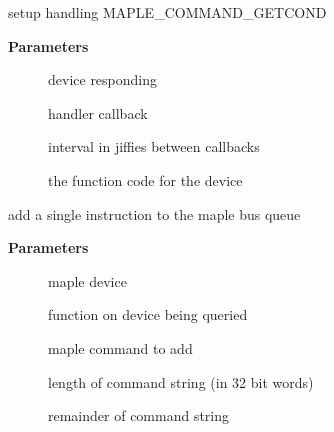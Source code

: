 \documentclass[a4paper,8pt,english]{sphinxmanual}
\begin{document}
\begin{fulllineitems}
\label{sh/index:c.maple_getcond_callback}
setup handling MAPLE\_COMMAND\_GETCOND

\end{fulllineitems}


\textbf{Parameters}
\begin{description}
\item[{}] \leavevmode
device responding

\item[{}] \leavevmode
handler callback

\item[{}] \leavevmode
interval in jiffies between callbacks

\item[{}] \leavevmode
the function code for the device

\end{description}

\begin{fulllineitems}
\label{sh/index:c.maple_add_packet}
add a single instruction to the maple bus queue

\end{fulllineitems}


\textbf{Parameters}
\begin{description}
\item[{}] \leavevmode
maple device

\item[{}] \leavevmode
function on device being queried

\item[{}] \leavevmode
maple command to add

\item[{}] \leavevmode
length of command string (in 32 bit words)

\item[{}] \leavevmode
remainder of command string

\end{description}



\renewcommand{\indexname}{Index}
\printindex
\end{document}
